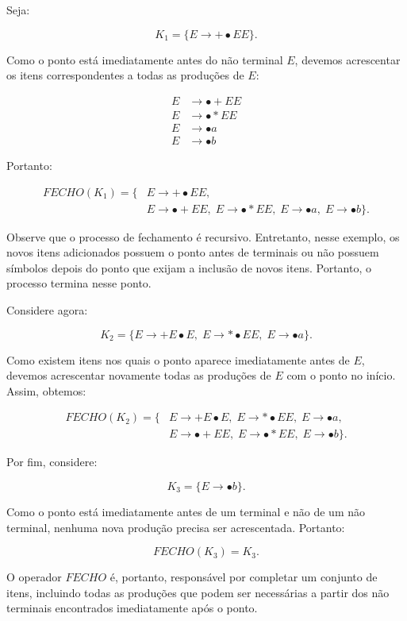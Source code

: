 \documentclass[
  brazilian,
  letterpaper,
]{book}
\theoremstyle{plain}
\theoremstyle{definition}
\theoremstyle{remark}
\begin{document}
Seja:

\[
K_1=\{E\rightarrow+\bullet EE\}.
\]

Como o ponto está imediatamente antes do não terminal \(E\), devemos
acrescentar os itens correspondentes a todas as produções de \(E\):

\[
\begin{aligned}
E&\rightarrow\bullet +EE\\
E&\rightarrow\bullet *EE\\
E&\rightarrow\bullet a\\
E&\rightarrow\bullet b
\end{aligned}
\]

Portanto:

\[
\begin{aligned}
FECHO(K_1)=\{&
E\rightarrow+\bullet EE,\\
&
E\rightarrow\bullet +EE,\;
E\rightarrow\bullet *EE,\;
E\rightarrow\bullet a,\;
E\rightarrow\bullet b
\}.
\end{aligned}
\]

Observe que o processo de fechamento é recursivo. Entretanto, nesse
exemplo, os novos itens adicionados possuem o ponto antes de terminais
ou não possuem símbolos depois do ponto que exijam a inclusão de novos
itens. Portanto, o processo termina nesse ponto.

Considere agora:

\[
K_2=
\{
E\rightarrow+E\bullet E,\;
E\rightarrow*\bullet EE,\;
E\rightarrow\bullet a
\}.
\]

Como existem itens nos quais o ponto aparece imediatamente antes de
\(E\), devemos acrescentar novamente todas as produções de \(E\) com o
ponto no início. Assim, obtemos:

\[
\begin{aligned}
FECHO(K_2)=\{&
E\rightarrow+E\bullet E,\;
E\rightarrow*\bullet EE,\;
E\rightarrow\bullet a,\\
&
E\rightarrow\bullet +EE,\;
E\rightarrow\bullet *EE,\;
E\rightarrow\bullet b
\}.
\end{aligned}
\]

Por fim, considere:

\[
K_3=\{E\rightarrow\bullet b\}.
\]

Como o ponto está imediatamente antes de um terminal e não de um não
terminal, nenhuma nova produção precisa ser acrescentada. Portanto:

\[
FECHO(K_3)=K_3.
\]

O operador \(FECHO\) é, portanto, responsável por completar um conjunto
de itens, incluindo todas as produções que podem ser necessárias a
partir dos não terminais encontrados imediatamente após o ponto.
\end{document}

